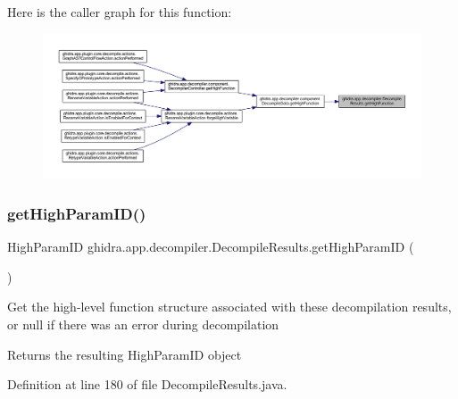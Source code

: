 Here is the caller graph for this function\+:
\nopagebreak
\begin{figure}[H]
\begin{center}
\leavevmode
\includegraphics[width=350pt]{classghidra_1_1app_1_1decompiler_1_1_decompile_results_a47a5e5504a7d915f1edecbca48977e2e_icgraph}
\end{center}
\end{figure}
\mbox{\label{classghidra_1_1app_1_1decompiler_1_1_decompile_results_a272e9f87e48dde339d3648090af78ab0}} 
\subsubsection{\texorpdfstring{getHighParamID()}{getHighParamID()}}
{\footnotesize\ttfamily High\+Param\+ID ghidra.\+app.\+decompiler.\+Decompile\+Results.\+get\+High\+Param\+ID (\begin{DoxyParamCaption}{ }\end{DoxyParamCaption})\hspace{0.3cm}{\ttfamily [inline]}}

Get the high-\/level function structure associated with these decompilation results, or null if there was an error during decompilation \begin{DoxyReturn}{Returns}
the resulting High\+Param\+ID object 
\end{DoxyReturn}


Definition at line 180 of file Decompile\+Results.\+java.

\mbox{\label{classghidra_1_1app_1_1decompiler_1_1_decompile_results_a4777184173e22095d06f713a354e5f1e}} 
